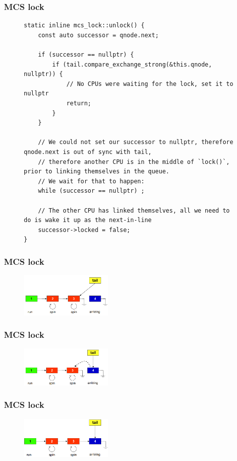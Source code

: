 \documentclass[aspectratio=169, pdf, 8pt, unicode]{beamer}
\begin{document}
\begin{frame}[fragile]
\frametitle{MCS lock}
\begin{figure}[H]
\begin{minipage}{0.8\textwidth}
\small
\begin{verbatim}
static inline mcs_lock::unlock() {
    const auto successor = qnode.next;

    if (successor == nullptr) {
        if (tail.compare_exchange_strong(&this.qnode, nullptr)) {
            // No CPUs were waiting for the lock, set it to nullptr
            return;
        }
    }

    // We could not set our successor to nullptr, therefore qnode.next is out of sync with tail,
    // therefore another CPU is in the middle of `lock()`, prior to linking themselves in the queue.
    // We wait for that to happen:
    while (successor == nullptr) ;

    // The other CPU has linked themselves, all we need to do is wake it up as the next-in-line
    successor->locked = false;
}
\end{verbatim}
\end{minipage}
\end{figure}
\end{frame}

\begin{frame}
\frametitle{MCS lock}
\begin{figure}[H]
\centering
\includegraphics[width=0.4\textwidth]{fig/mcs1.png}
\end{figure}
\end{frame}

\begin{frame}
\frametitle{MCS lock}
\begin{figure}[H]
\centering
\includegraphics[width=0.4\textwidth]{fig/mcs2.png}
\end{figure}
\end{frame}

\begin{frame}
\frametitle{MCS lock}
\begin{figure}[H]
\centering
\includegraphics[width=0.4\textwidth]{fig/mcs3.png}
\end{figure}
\end{frame}
\end{document}
